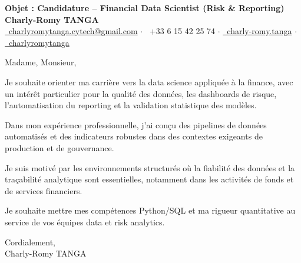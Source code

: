 \documentclass[10pt, letterpaper]{article}
\begin{document}
\begin{center}
\textbf{\LARGE Objet : Candidature -- Financial Data Scientist (Risk \& Reporting)}\\[0.2cm]
\textbf{\large Charly-Romy TANGA}\\[0.2cm]
\href{mailto:charlyromytanga.cytech@gmail.com}{\faEnvelope\ charlyromytanga.cytech@gmail.com} \quad$\cdot$\quad
\faPhone\ +33 6 15 42 25 74 \quad$\cdot$\quad
\href{https://www.linkedin.com/in/charly-romy-tanga}{\faLinkedin\ charly-romy.tanga} \quad$\cdot$\quad
\href{https://github.com/charlyromytanga}{\faGithub\ charlyromytanga}
\end{center}
Madame, Monsieur,

Je souhaite orienter ma carrière vers la data science appliquée à la finance, avec un intérêt particulier pour la qualité des données, les dashboards de risque, l'automatisation du reporting et la validation statistique des modèles.

Dans mon expérience professionnelle, j'ai conçu des pipelines de données automatisés et des indicateurs robustes dans des contextes exigeants de production et de gouvernance.

Je suis motivé par les environnements structurés où la fiabilité des données et la traçabilité analytique sont essentielles, notamment dans les activités de fonds et de services financiers.

Je souhaite mettre mes compétences Python/SQL et ma rigueur quantitative au service de vos équipes data et risk analytics.

Cordialement,\\
Charly-Romy TANGA
\end{document}

